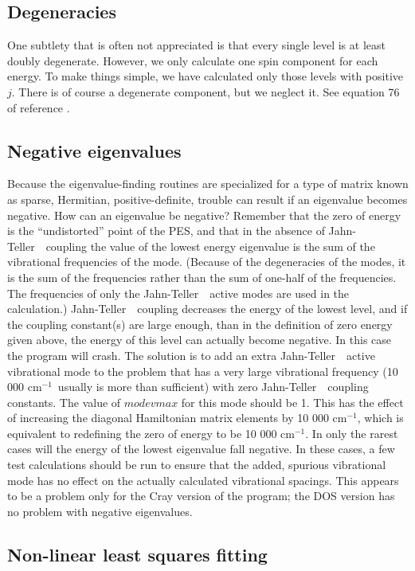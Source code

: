 \documentclass{article}
\newcommand{\wn}{cm$^{-1}$}
\newcommand{\JT}{Jahn-Teller\ }
\begin{document}
\subsection{Degeneracies}
One subtlety that is often not appreciated is that every single level
is at least doubly degenerate. However, we only calculate one spin
component for each energy. To make things simple, we have calculated
only those levels with positive $j$. There is of course a degenerate
component, but we neglect it. See equation 76 of reference .

\subsection{Negative eigenvalues} \label{section:negeigs}
Because the eigenvalue-finding routines are specialized for a
type of matrix known as sparse, Hermitian, positive-definite,
trouble can result if an eigenvalue becomes negative. How can an
eigenvalue be negative? Remember that the zero of energy is the
``undistorted'' point of the PES, and that in the absence of \JT\
coupling the value of the lowest energy eigenvalue is the sum of the
vibrational frequencies of the mode. (Because of the degeneracies of
the modes, it is the sum of the frequencies rather than the sum of
one-half of the frequencies. The frequencies of only the \JT\ active
modes are used in the calculation.) \JT\ coupling decreases the
energy of the lowest level, and if the coupling constant(s) are
large enough, than in the definition of zero energy given above, the
energy of this level can actually become negative. In this case the
program will crash. The solution is to add an extra \JT\ active
vibrational mode to the problem that has a very large vibrational
frequency (10 000 \wn\ usually is more than sufficient) with zero
\JT\ coupling constants. The value of $modevmax$ for this mode
should be 1. This has the effect of increasing the diagonal
Hamiltonian matrix elements by 10 000 \wn , which is equivalent to
redefining the zero of energy to be 10 000 \wn . In only the rarest
cases will the energy of the lowest eigenvalue fall negative. In
these cases, a few test calculations should be run to ensure that
the added, spurious vibrational mode has no effect on the actually
calculated vibrational spacings. This appears to be a problem only for
the Cray version of the program; the DOS version has no problem with
negative eigenvalues.

\subsection{Non-linear least squares fitting} \label{section:fitting}
\end{document}
